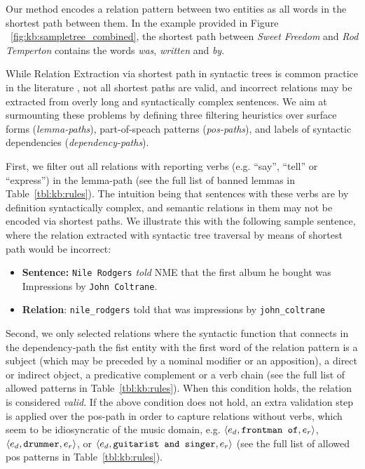 Our method encodes a relation pattern between two entities as all words in the shortest path between them. In the example provided in Figure ~\ref{fig:kb:sampletree_combined}, the shortest path between \emph{Sweet Freedom} and \emph{Rod Temperton} contains the words \textit{was}, \textit{written} and \textit{by}.

While Relation Extraction via shortest path in syntactic trees is common practice in the literature \citep{DelliBovietal2015b,MoroandNavigli2012,Nakasholeetal2012}, not all shortest paths are valid, and incorrect relations may be extracted from overly long and syntactically complex sentences. We aim at surmounting these problems by defining three filtering heuristics over surface forms (\textit{lemma-paths}), part-of-speach patterns (\textit{pos-paths}), and labels of syntactic dependencies (\textit{dependency-paths}).

First, we filter out all relations with reporting verbs (e.g. ``say'', ``tell'' or ``express'') in the lemma-path (see the full list of banned lemmas in Table~\ref{tbl:kb:rules}). The intuition being that sentences with these verbs are by definition syntactically complex, and semantic relations in them may not be encoded via shortest paths. We illustrate this with the following sample sentence, where the relation extracted with syntactic tree traversal by means of shortest path would be incorrect:

\begin{itemize}
\item[] \textbf{Sentence:} \texttt{Nile Rodgers} \textit{told} NME that the first album he bought was Impressions by \texttt{John Coltrane}.
\item[] \textbf{Relation}: \texttt{nile\_rodgers} told that was impressions by \texttt{john\_coltrane}
\end{itemize}

Second, we only selected relations where the syntactic function that connects in the dependency-path the fist entity with the first word of the relation pattern is a subject (which may be preceded by a nominal modifier or an apposition), a direct or indirect object, a predicative complement or a verb chain (see the full list of allowed patterns in Table~\ref{tbl:kb:rules}). When this condition holds, the relation is considered \textit{valid}. If the above condition does not hold, an extra validation step is applied over the pos-path in order to capture relations without verbs, which seem to be idiosyncratic of the music domain, e.g. $\langle e_d, \mbox{\texttt{frontman of}}, e_r \rangle$, $\langle e_d, \mbox{\texttt{drummer}}, e_r \rangle$, or $\langle e_d, \mbox{\texttt{guitarist and singer}}, e_r \rangle$ (see the full list of allowed pos patterns in Table~\ref{tbl:kb:rules}).


